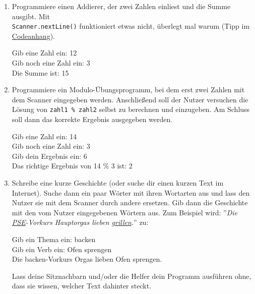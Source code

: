 \documentclass{../../sheet}
\begin{document}
\begin{enumerate}
	\item Programmiere einen Addierer, der zwei Zahlen einliest und die Summe ausgibt. Mit \\ \texttt{Scanner.nextLine()} funktioniert etwas nicht, überlegt mal warum (Tipp im \hyperlink{Aufgabe_2.1}{Codeanhang}).
	      \begin{ausgabe}
		      Gib eine Zahl ein: 12\\
		      Gib noch eine Zahl ein: 3\\
		      Die Summe ist: 15
	      \end{ausgabe}
	\item Programmiere ein Modulo-Übungsprogramm, bei dem erst zwei Zahlen mit dem Scanner eingegeben werden. Anschließend soll der Nutzer versuchen die Lösung von \texttt{zahl1 \% zahl2} selbst zu berechnen und einzugeben. Am Schluss soll dann das korrekte Ergebnis ausgegeben werden.
	      \begin{ausgabe}
		      Gib eine Zahl ein: 14\\
		      Gib noch eine Zahl ein: 3\\
		      Gib dein Ergebnis ein: 6\\
		      Das richtige Ergebnis von 14 \% 3 ist: 2
	      \end{ausgabe}
	\item Schreibe eine kurze Geschichte (oder suche dir einen kurzen Text im Internet). Suche dann ein paar Wörter mit ihren Wortarten aus und lass den Nutzer sie mit dem Scanner durch andere ersetzen. Gib dann die Geschichte mit den vom Nutzer eingegebenen Wörtern aus. Zum Beispiel wird: ''\textit{Die \underline{PSE}-Vorkurs Hauptorgas lieben \underline{grillen}.}'' \space zu:
	      \begin{ausgabe}
		      Gib ein Thema ein: backen\\
		      Gib ein Verb ein: Ofen sprengen\\
		      Die backen-Vorkurs Orgas lieben Ofen sprengen.
	      \end{ausgabe}
	      Lass deine Sitznachbarn und/oder die Helfer dein Programm ausführen ohne, dass sie wissen, welcher Text dahinter steckt.
\end{enumerate}
\end{document}
